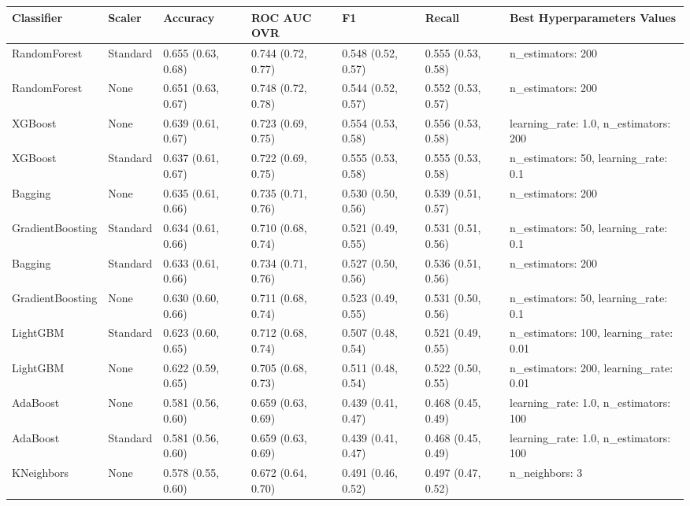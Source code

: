 \begin{tabular}{lllllll}
\toprule
Classifier & Scaler & Accuracy & ROC AUC OVR & F1 & Recall & Best Hyperparameters Values \\
\midrule
RandomForest & Standard & 0.655 (0.63, 0.68) & 0.744 (0.72, 0.77) & 0.548 (0.52, 0.57) & 0.555 (0.53, 0.58) & {{n\_estimators: 200}} \\
RandomForest & None & 0.651 (0.63, 0.67) & 0.748 (0.72, 0.78) & 0.544 (0.52, 0.57) & 0.552 (0.53, 0.57) & {{n\_estimators: 200}} \\
XGBoost & None & 0.639 (0.61, 0.67) & 0.723 (0.69, 0.75) & 0.554 (0.53, 0.58) & 0.556 (0.53, 0.58) & {{learning\_rate: 1.0, n\_estimators: 200}} \\
XGBoost & Standard & 0.637 (0.61, 0.67) & 0.722 (0.69, 0.75) & 0.555 (0.53, 0.58) & 0.555 (0.53, 0.58) & {{n\_estimators: 50, learning\_rate: 0.1}} \\
Bagging & None & 0.635 (0.61, 0.66) & 0.735 (0.71, 0.76) & 0.530 (0.50, 0.56) & 0.539 (0.51, 0.57) & {{n\_estimators: 200}} \\
GradientBoosting & Standard & 0.634 (0.61, 0.66) & 0.710 (0.68, 0.74) & 0.521 (0.49, 0.55) & 0.531 (0.51, 0.56) & {{n\_estimators: 50, learning\_rate: 0.1}} \\
Bagging & Standard & 0.633 (0.61, 0.66) & 0.734 (0.71, 0.76) & 0.527 (0.50, 0.56) & 0.536 (0.51, 0.56) & {{n\_estimators: 200}} \\
GradientBoosting & None & 0.630 (0.60, 0.66) & 0.711 (0.68, 0.74) & 0.523 (0.49, 0.55) & 0.531 (0.50, 0.56) & {{n\_estimators: 50, learning\_rate: 0.1}} \\
LightGBM & Standard & 0.623 (0.60, 0.65) & 0.712 (0.68, 0.74) & 0.507 (0.48, 0.54) & 0.521 (0.49, 0.55) & {{n\_estimators: 100, learning\_rate: 0.01}} \\
LightGBM & None & 0.622 (0.59, 0.65) & 0.705 (0.68, 0.73) & 0.511 (0.48, 0.54) & 0.522 (0.50, 0.55) & {{n\_estimators: 200, learning\_rate: 0.01}} \\
AdaBoost & None & 0.581 (0.56, 0.60) & 0.659 (0.63, 0.69) & 0.439 (0.41, 0.47) & 0.468 (0.45, 0.49) & {{learning\_rate: 1.0, n\_estimators: 100}} \\
AdaBoost & Standard & 0.581 (0.56, 0.60) & 0.659 (0.63, 0.69) & 0.439 (0.41, 0.47) & 0.468 (0.45, 0.49) & {{learning\_rate: 1.0, n\_estimators: 100}} \\
KNeighbors & None & 0.578 (0.55, 0.60) & 0.672 (0.64, 0.70) & 0.491 (0.46, 0.52) & 0.497 (0.47, 0.52) & {{n\_neighbors: 3}} \\

\end{tabular}
